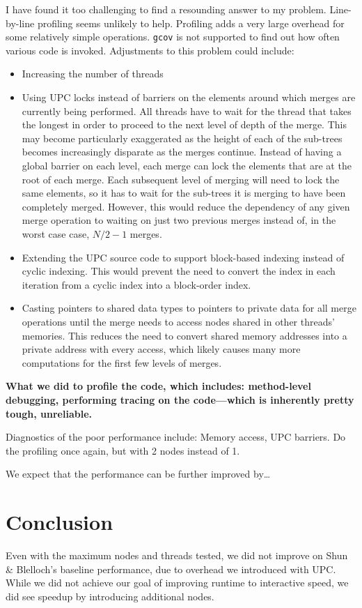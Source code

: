 \documentclass[10pt]{article}
\begin{document}
I have found it too challenging to find a resounding answer to my problem.
Line-by-line profiling seems unlikely to help.
Profiling adds a very large overhead for some relatively simple operations.
\texttt{gcov} is not supported to find out how often various code is invoked.
Adjustments to this problem could include:
\begin{itemize}
  \item Increasing the number of threads
  \item Using UPC locks instead of barriers on the elements around which merges are currently being 
        performed.
        All threads have to wait for the thread that takes the longest in order to proceed to the
        next level of depth of the merge.
        This may become particularly exaggerated as the height of each of the sub-trees becomes
        increasingly disparate as the merges continue.
        Instead of having a global barrier on each level, each merge can lock the elements that
        are at the root of each merge.
        Each subsequent level of merging will need to lock the same elements, so it has to wait
        for the sub-trees it is merging to have been completely merged.
        However, this would reduce the dependency of any given merge operation to waiting on just
        two previous merges instead of, in the worst case case, $N / 2 - 1$ merges.
  \item Extending the UPC source code to support block-based indexing instead of cyclic indexing.
        This would prevent the need to convert the index in each iteration from a cyclic index
        into a block-order index.
  \item Casting pointers to shared data types to pointers to private data for all merge operations
        until the merge needs to access nodes shared in other threads' memories.
        This reduces the need to convert shared memory addresses into a private address with every
        access, which likely causes many more computations for the first few levels of merges.
\end{itemize}

\textbf{%
What we did to profile the code, which includes:
method-level debugging,
performing tracing on the code---which is inherently pretty tough, unreliable.
}

Diagnostics of the poor performance include:
Memory access, UPC barriers.
Do the profiling once again, but with 2 nodes instead of 1.

We expect that the performance can be further improved by\ldots{}

\section{Conclusion}

Even with the maximum nodes and threads tested, we did not improve on Shun \& Blelloch's 
baseline performance, due to overhead we introduced with UPC\@.
While we did not achieve our goal of improving runtime to interactive speed, we did see speedup by introducing additional nodes.

\printbibliography{}
\end{document}
